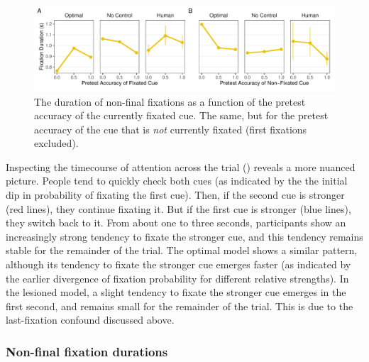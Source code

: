 \begin{figure}[t!]
  \includegraphics[scale=.65]{figs/memory/exp2/nonfinal.pdf}
  \caption{
     The duration of non-final fixations as a function of the pretest accuracy of the currently fixated cue.
     The same, but for the pretest accuracy of the cue that is \emph{not} currently fixated (first fixations excluded).
  \label{fig:nonfinal}
}
\end{figure}


Inspecting the timecourse of attention across the trial () reveals a more nuanced picture. People tend to quickly check both cues (as indicated by the the initial dip in probability of fixating the first cue). Then, if the second cue is stronger (red lines), they continue fixating it. But if the first cue is stronger (blue lines), they switch back to it. From about one to three seconds, participants show an increasingly strong tendency to fixate the stronger cue, and this tendency remains stable for the remainder of the trial. The optimal model shows a similar pattern, although its tendency to fixate the stronger cue emerges faster (as indicated by the earlier divergence of fixation probability for different relative strengths). In the lesioned model, a slight tendency to fixate the stronger cue emerges in the first second, and remains small for the remainder of the trial. This is due to the last-fixation confound discussed above.

\subsubsection{Non-final fixation durations}

